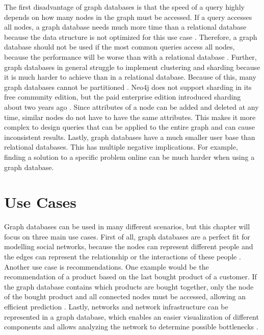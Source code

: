 The first disadvantage of graph databases is that the speed of a query highly depends on how many nodes in the graph must be accessed. If a query accesses all nodes, a graph database needs much more time than a relational database because the data structure is not optimized for this use case \parencite{adv_and_disadv_neo4j}. Therefore, a graph database should not be used if the most common queries access all nodes, because the performance will be worse than with a relational database \parencite{comparison_neo4j}. 
Further, graph databases in general struggle to implement clustering and sharding because it is much harder to achieve than in a relational database. Because of this, many graph databases cannot be partitioned \parencite{comparison_neo4j}. Neo4j does not support sharding in its free community edition, but the paid enterprise edition introduced sharding about two years ago \parencite{use_cases_neo4j}. 
Since attributes of a node can be added and deleted at any time, similar nodes do not have to have the same attributes. This makes it more complex to design queries that can be applied to the entire graph and can cause inconsistent results. \parencite{comparison_neo4j}
Lastly, graph databases have a much smaller user base than relational databases. This has multiple negative implications. For example, finding a solution to a specific problem online can be much harder when using a graph database. 

\section{Use Cases} \label{sec:useCasesNeo4j}

Graph databases can be used in many different scenarios, but this chapter will focus on three main use cases. First of all, graph databases are a perfect fit for modelling social networks, because the nodes can represent different people and the edges can represent the relationship or the interactions of these people \parencite{use_cases_graph_databases}. 
Another use case is recommendations. One example would be the recommendation of a product based on the last bought product of a customer. If the graph database contains which products are bought together, only the node of the bought product and all connected nodes must be accessed, allowing an efficient prediction \parencite{use_cases_neo4j}. 
Lastly, networks and network infrastructure can be represented in a graph database, which enables an easier visualization of different components and allows analyzing the network to determine possible bottlenecks \parencite{use_cases_graph_databases}.

